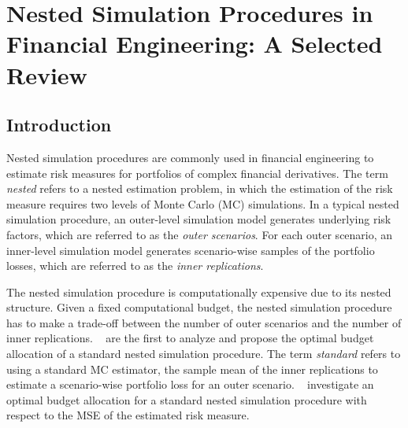 \chapter{Nested Simulation Procedures in Financial Engineering: A Selected Review} \label{chap:project1}


\section{Introduction}

Nested simulation procedures are commonly used in financial engineering to estimate risk measures for portfolios of complex financial derivatives. 
The term \textit{nested} refers to a nested estimation problem, in which the estimation of the risk measure requires two levels of Monte Carlo (MC) simulations.
In a typical nested simulation procedure, an outer-level simulation model generates underlying risk factors, which are referred to as the \textit{outer scenarios}.
For each outer scenario, an inner-level simulation model generates scenario-wise samples of the portfolio losses, which are referred to as the \textit{inner replications}.

The nested simulation procedure is computationally expensive due to its nested structure. 
Given a fixed computational budget, the nested simulation procedure has to make a trade-off between the number of outer scenarios and the number of inner replications.
~\cite{gordy2010nested} are the first to analyze and propose the optimal budget allocation of a standard nested simulation procedure. 
The term \textit{standard} refers to using a standard MC estimator, the sample mean of the inner replications to estimate a scenario-wise portfolio loss for an outer scenario.
~\cite{gordy2010nested} investigate an optimal budget allocation for a standard nested simulation procedure with respect to the MSE of the estimated risk measure.

